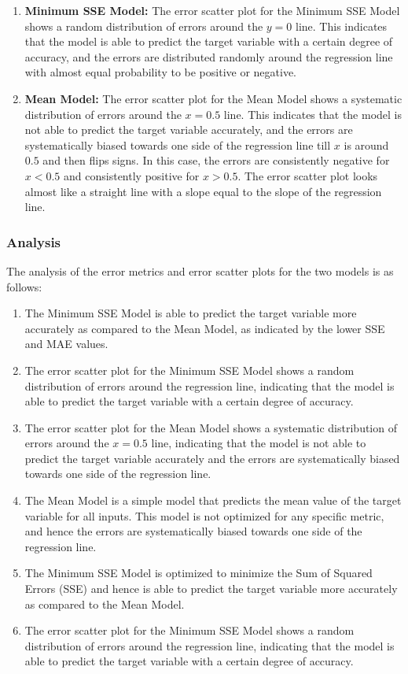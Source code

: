 \begin{enumerate}
	\item \textbf{Minimum SSE Model:} The error scatter plot for the Minimum SSE Model shows a random distribution of errors around the $y = 0$ line. This indicates that the model is able to predict the target variable with a certain degree of accuracy, and the errors are distributed randomly around the regression line with almost equal probability to be positive or negative.
	\item \textbf{Mean Model:} The error scatter plot for the Mean Model shows a systematic distribution of errors around the $x = 0.5$ line. This indicates that the model is not able to predict the target variable accurately, and the errors are systematically biased towards one side of the regression line till $x$ is around $0.5$ and then flips signs. In this case, the errors are consistently negative for $x < 0.5$ and consistently positive for $x > 0.5$. The error scatter plot looks almost like a straight line with a slope equal to the slope of the regression line.
\end{enumerate}

\clearpage

\subsubsection{Analysis}

The analysis of the error metrics and error scatter plots for the two models is as follows:

\begin{enumerate}
	\item The Minimum SSE Model is able to predict the target variable more accurately as compared to the Mean Model, as indicated by the lower SSE and MAE values.
	\item The error scatter plot for the Minimum SSE Model shows a random distribution of errors around the regression line, indicating that the model is able to predict the target variable with a certain degree of accuracy.
	\item The error scatter plot for the Mean Model shows a systematic distribution of errors around the $x = 0.5$ line, indicating that the model is not able to predict the target variable accurately and the errors are systematically biased towards one side of the regression line.
	\item The Mean Model is a simple model that predicts the mean value of the target variable for all inputs. This model is not optimized for any specific metric, and hence the errors are systematically biased towards one side of the regression line.
	\item The Minimum SSE Model is optimized to minimize the Sum of Squared Errors (SSE) and hence is able to predict the target variable more accurately as compared to the Mean Model.
	\item The error scatter plot for the Minimum SSE Model shows a random distribution of errors around the regression line, indicating that the model is able to predict the target variable with a certain degree of accuracy.
\end{enumerate}

